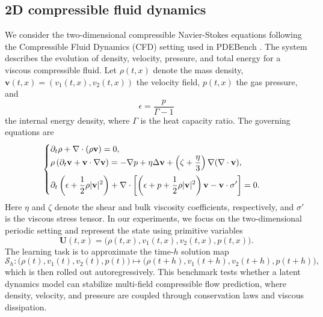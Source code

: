 \documentclass[11pt]{article}
\begin{document}
\subsection{2D compressible fluid dynamics} 
We consider the two-dimensional compressible Navier-Stokes equations following the Compressible Fluid Dynamics (CFD) setting used in PDEBench \citep{takamoto2022pdebench}. The system describes the evolution of density, velocity, pressure, and total energy for a viscous compressible fluid. Let $\rho(t,x)$ denote the mass density, $\mathbf{v}(t,x)=(v_1(t,x),v_2(t,x))$ the velocity field, $p(t,x)$ the gas pressure, and 
\[
    \epsilon = \frac{p}{\Gamma-1}
\]
the internal energy density, where $\Gamma$ is the heat capacity ratio. The governing equations are
\begin{equation}
\begin{cases}
    \partial_t \rho + \nabla\cdot(\rho \mathbf{v}) = 0,\\
    \displaystyle\rho\left(\partial_t \mathbf{v} + \mathbf{v}\cdot\nabla \mathbf{v}\right)
    =
    -\nabla p
    + \eta \Delta\mathbf{v}
    + \left(\zeta+\frac{\eta}{3}\right)\nabla(\nabla\cdot \mathbf{v}),\vspace{0.2cm}\\
    \displaystyle\partial_t\left(\epsilon+\frac{1}{2}\rho |\mathbf{v}|^2\right)
    +
    \nabla\cdot\left[\left(\epsilon+p+\frac{1}{2}\rho |\mathbf{v}|^2\right)\mathbf{v}
        - \mathbf{v}\cdot\sigma^\prime
    \right]
    =0.
\end{cases}
\label{eq:cfd2d}
\end{equation}
Here $\eta$ and $\zeta$ denote the shear and bulk viscosity coefficients, respectively, and $\sigma'$ is the viscous stress tensor. In our experiments, we focus on the two-dimensional periodic setting and represent the state using primitive variables
\[
\mathbf{U}(t,x)=\bigl(\rho(t,x), v_1(t,x), v_2(t,x), p(t,x)\bigr).
\]
The learning task is to approximate the time-$h$ solution map
\[
    \mathcal S_{h}:
    \bigl(\rho(t),v_1(t),v_2(t),p(t)\bigr)
    \mapsto
    \bigl(\rho(t+h),v_1(t+h),v_2(t+h),p(t+h)\bigr),
\]
which is then rolled out autoregressively. This benchmark tests whether a latent dynamics model can stabilize multi-field compressible flow prediction, where density, velocity, and pressure are coupled through conservation laws and viscous dissipation.
\end{document}
